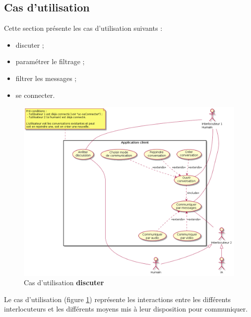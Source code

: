 \documentclass[11pt,dvipsnames,svgnames]{report}
\begin{document}
\subsection*{Cas d'utilisation}

Cette section présente les cas d'utilisation suivants :
\begin{itemize}
\item discuter ;
\item paramétrer le filtrage ;
\item filtrer les messages ;
\item se connecter.
\end{itemize}

\begin{figure}[H]
\includegraphics[scale=0.55]{images/uc-discuter.png}
\caption{Cas d'utilisation \textbf{discuter}}
\label{cas1}
\end{figure}
Le cas d'utilisation (figure \ref{cas1}) représente les interactions entre les différents interlocuteurs et les différents moyens mis à leur disposition pour communiquer.
\end{document}
